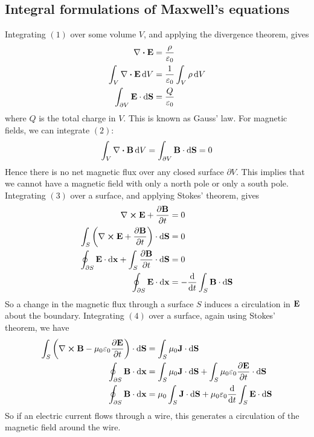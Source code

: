\subsection{Integral formulations of Maxwell's equations}
Integrating \((1)\) over some volume \(V\), and applying the divergence theorem, gives
\begin{align*}
	\div{\vb E}                              & = \frac{\rho}{\varepsilon_0}                 \\
	\int_V \div{\vb E} \dd{V}                & = \frac{1}{\varepsilon_0} \int_V \rho \dd{V} \\
	\int_{\partial V} \vb E \cdot \dd{\vb S} & = \frac{Q}{\varepsilon_0}                    \\
\end{align*}
where \(Q\) is the total charge in \(V\).
This is known as Gauss' law.
For magnetic fields, we can integrate \((2)\):
\[
	\int_{V} \div{\vb B} \dd{V} = \int_{\partial V} \vb B \cdot \dd{\vb S} = 0
\]
Hence there is no net magnetic flux over any closed surface \(\partial V\).
This implies that we cannot have a magnetic field with only a north pole or only a south pole.
Integrating \((3)\) over a surface, and applying Stokes' theorem, gives
\begin{align*}
	\curl{\vb E} + \pdv{\vb B}{t}                                                      & = 0                                     \\
	\int_S \qty(\curl{\vb E} + \pdv{\vb B}{t}) \cdot \dd{\vb S}                        & = 0                                     \\
	\oint_{\partial S} \vb E \cdot \dd{\vb x} + \int_S \pdv{\vb B}{t} \cdot \dd{\vb S} & = 0                                     \\
	\oint_{\partial S} \vb E \cdot \dd{\vb x}                                          & = -\dv{t} \int_S \vb B \cdot \dd{\vb S}
\end{align*}
So a change in the magnetic flux through a surface \(S\) induces a circulation in \(\vb E\) about the boundary.
Integrating \((4)\) over a surface, again using Stokes' theorem, we have
\begin{align*}
	\int_S \qty(\curl{\vb B} - \mu_0\varepsilon_0 \pdv{\vb E}{t}) \cdot \dd{\vb S} & = \int_S \mu_0 \vb J \cdot \dd{\vb S}                                                             \\
	\oint_{\partial S} \vb B \cdot \dd{\vb x}                                      & = \int_S \mu_0 \vb J \cdot \dd{\vb S} + \int_S \mu_0\varepsilon_0 \pdv{\vb E}{t} \cdot \dd{\vb S} \\
	\oint_{\partial S} \vb B \cdot \dd{\vb x}                                      & = \mu_0 \int_S \vb J \cdot \dd{\vb S} + \mu_0\varepsilon_0 \dv{t} \int_S \vb E \cdot \dd{\vb S}   \\
\end{align*}
So if an electric current flows through a wire, this generates a circulation of the magnetic field around the wire.


